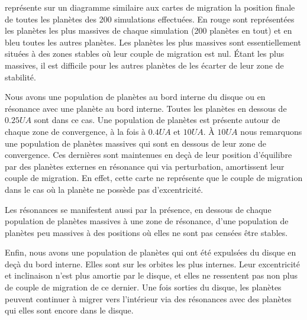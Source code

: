  représente sur un diagramme similaire aux cartes de migration la position finale de toutes les planètes des 200 simulations effectuées. En rouge sont représentées les planètes les plus massives de chaque simulation (200 planètes en tout) et en bleu toutes les autres planètes. Les planètes les plus massives sont essentiellement situées à des zones stables où leur couple de migration est nul. Étant les plus massives, il est difficile pour les autres planètes de les écarter de leur zone de stabilité. 

Nous avons une population de planètes au bord interne du disque ou en résonance avec une planète au bord interne. Toutes les
planètes en dessous de $0.25\unit{UA}$ sont dans ce cas. Une population de planètes est présente autour de chaque zone de
convergence, à la fois à $0.4\unit{UA}$ et $10\unit{UA}$. À $10\unit{UA}$ nous remarquons une population de planètes massives
qui sont en dessous de leur zone de convergence. Ces dernières sont maintenues en deçà de leur position d'équilibre par des
planètes externes en résonance qui via perturbation, amortissent leur couple de migration. En effet, cette carte ne représente
que le couple de migration dans le cas où la planète ne possède pas d'excentricité. 

Les résonances se manifestent aussi par la présence, en dessous de chaque population de planètes massives à une zone de
résonance, d'une population de planètes peu massives à des positions où elles ne sont pas censées être stables. 

Enfin, nous avons une population de planètes qui ont été expulsées du disque en deçà du bord interne. Elles sont sur les orbites
les plus internes. Leur excentricité et inclinaison n'est plus amortie par le disque, et elles ne ressentent pas non plus de
couple de migration de ce dernier. Une fois sorties du disque, les planètes peuvent continuer à migrer vers l'intérieur via des résonances avec des planètes qui elles sont encore dans le disque. 

